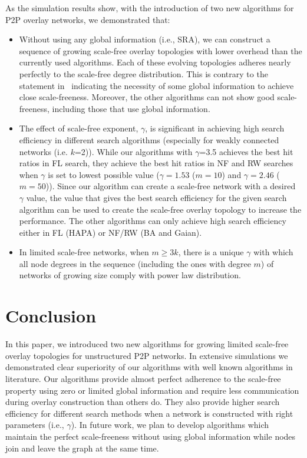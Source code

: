 \documentclass[10pt,journal,cspaper,compsoc]{IEEEtran}
\begin{document}
As the simulation results show, with the introduction of two new algorithms for P2P overlay networks, we demonstrated that:
\begin{itemize}
\item Without using any global information (i.e., SRA), we can construct a sequence of growing scale-free overlay topologies with lower overhead than the currently used algorithms. Each of these evolving topologies adheres nearly perfectly to the scale-free degree distribution. This is contrary to the statement in~\cite{guclu} indicating the necessity of some global information to achieve close scale-freeness. Moreover, the other algorithms can not show good scale-freeness, including those that use global information.
\item The effect of scale-free exponent, $\gamma$, is significant in achieving high search efficiency in different search algorithms (especially for weakly connected networks (i.e. $k$=2)). While our algorithms with $\gamma$=3.5 achieves the best hit ratios in FL search, they achieve the best hit ratios in NF and RW searches when $\gamma$ is set to lowest possible value ($\gamma=1.53$ ($m=10$) and $\gamma=2.46$ ($m=50$)). Since our algorithm can create a scale-free network with a desired $\gamma$ value, the value that gives the best search efficiency for the given search algorithm can be used to create the scale-free overlay topology to increase the performance. The other algorithms can only achieve high search efficiency either in FL (HAPA) or NF/RW (BA and Gaian).
\item In limited scale-free networks, when $m\geq 3k$, there is a unique $\gamma$ with which all node degrees in the sequence (including the ones with degree $m$) of networks of growing size comply with power law distribution.
\end{itemize}









\section{Conclusion}
\label{sec:conclusion}

In this paper, we introduced two new algorithms for growing limited scale-free overlay topologies for unstructured P2P networks. In extensive simulations we demonstrated clear superiority of our algorithms with well known algorithms in literature. Our algorithms provide almost perfect adherence to the scale-free property using zero or limited global information and require less communication during overlay construction than others do. They also provide higher search efficiency for different search methods when a network is constructed with right parameters (i.e., $\gamma$). In future work, we plan to develop algorithms which maintain the perfect scale-freeness without using global information while nodes join and leave the graph at the same time.
\end{document}
